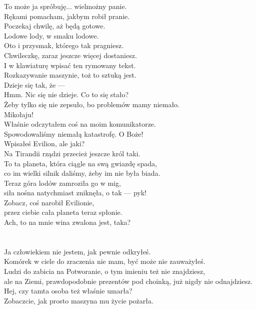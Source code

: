 \charmik{}
To może ja spróbuję... wielmożny panie.\\
Rękami pomacham, jakbym robił pranie.\\
Poczekaj chwilę, aż będą gotowe.\\
Lodowe lody, w smaku lodowe.\\
Oto i przysmak, którego tak pragniesz.\\
Chwileczkę, zaraz jeszcze więcej dostaniesz.\\
I w klawiaturę wpisać ten rymowany tekst.\\
Rozkazywanie maszynie, toż to sztuką jest.\\
Dzieje się tak, że --- \\
Hmm. Nic się nie dzieje. Co to się stało?\\
Żeby tylko się nie zepsuło, bo problemów mamy niemało.\\

\charnad{}
Mikołaju!\\
Właśnie odczytałem coś na moim komunikatorze. \\
Spowodowaliśmy niemałą katastrofę. O Boże!\\
Wpisałeś Evilion, ale jaki?\\
Na Tirandii rządzi przecież jeszcze król taki.\\
To ta planeta, która ciągle na swą gwiazdę spada,\\
co im wielki silnik daliśmy, żeby im nie była biada.\\
Teraz góra lodów zamroziła go w mig,\\
siła nośna natychmiast zniknęła, o tak --- pyk!\\

\charmik{}
Zobacz, coś narobił Evilionie,\\
przez ciebie cała planeta teraz spłonie.\\

\chardok{}
Ach, to na mnie wina zwalona jest, taka?\\
\\

\\

\charmik{}
Ja człowiekiem nie jestem, jak pewnie odkryłeś.\\
Komórek w ciele do zraczenia nie mam, być może nie zauważyłeś.\\
Ludzi do zabicia na Potworanie, o tym imieniu też nie znajdziesz,\\
ale na Ziemi, prawdopodobnie prezentów pod choinką, już nigdy nie odnajdziesz.\\
Hej, czy tamta osoba też właśnie umarła?\\
Zobaczcie, jak prosto maszyna mu życie pożarła.\\

